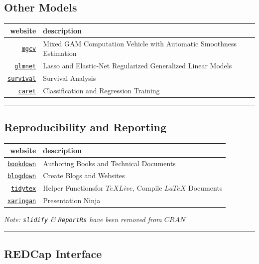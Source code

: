\documentclass[]{book}
\theoremstyle{definition}
\theoremstyle{definition}
\theoremstyle{definition}
\theoremstyle{remark}
\begin{document}
\subsection{Other Models}\label{other-models}

\begin{longtable}[]{@{}rl@{}}
\toprule
website & description\tabularnewline
\midrule
\endhead
\href{https://people.maths.bris.ac.uk/~sw15190/mgcv/tampere/mgcv.pdf}{\texttt{mgcv}}
& Mixed GAM Computation Vehicle with Automatic Smoothness
Estimation\tabularnewline
\href{https://web.stanford.edu/~hastie/glmnet/glmnet_alpha.html}{\texttt{glmnet}}
& Lasso and Elastic-Net Regularized Generalized Linear
Models\tabularnewline
\href{https://github.com/therneau/survival}{\texttt{survival}} &
Survival Analysis\tabularnewline
\href{https://topepo.github.io/caret/index.html}{\texttt{caret}} &
Classification and Regression Training\tabularnewline
\bottomrule
\end{longtable}

\begin{center}\rule{0.5\linewidth}{\linethickness}\end{center}

\subsection{Reproducibility and
Reporting}\label{reproducibility-and-reporting}

\begin{longtable}[]{@{}rl@{}}
\toprule
website & description\tabularnewline
\midrule
\endhead
\href{https://bookdown.org/}{\texttt{bookdown}} & Authoring Books and
Technical Documents\tabularnewline
\href{https://bookdown.org/yihui/blogdown/}{\texttt{blogdown}} & Create
Blogs and Websites\tabularnewline
\href{https://yihui.name/tinytex/}{\texttt{tidytex}} & Helper
Functionsfor \(TeX Live\), Compile \(LaTeX\) Documents\tabularnewline
\href{https://github.com/yihui/xaringan}{\texttt{xaringan}} &
Presentation Ninja\tabularnewline
\bottomrule
\end{longtable}

\emph{Note: \texttt{slidify} \& \texttt{ReportRs} have been removed from
\(CRAN\)}

\begin{center}\rule{0.5\linewidth}{\linethickness}\end{center}

\subsection{REDCap Interface}\label{redcap-interface}
\end{document}
